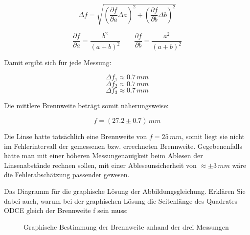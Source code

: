 \documentclass[
  headings=optiontotocandhead,
  twoside,
  openright,
  numbers=noenddot,
  toc=flat,
  11pt,
  parskip=full,
  listof=flat,
  bibliography=totoc,
  a4paper,
  DIV=14,
  BCOR=22mm,
  headheight=5mm,
  headinclude=true,
]{scrartcl}
\begin{document}
$$
\Delta f =
\sqrt{
\left(\frac{\partial f}{\partial a}\Delta a\right)^2+
\left(\frac{\partial f}{\partial b}\Delta b\right)^2
}
$$

$$
\frac{\partial f}{\partial a}
= \frac{b^2}{(a+b)^2}
\qquad
\frac{\partial f}{\partial b}
= \frac{a^2}{(a+b)^2}
$$

Damit ergibt sich für jede Messung:

$$\Delta f_1 \approx 0.7\,mm$$
$$\Delta f_2 \approx 0.7\,mm$$
$$\Delta f_3 \approx 0.7\,mm$$

Die mittlere Brennweite beträgt somit näherungsweise:

$$
f = (27.2 \pm 0.7)\,mm
$$

Die Linse hatte tatsächlich eine Brennweite von $f = 25 \, mm$, somit liegt sie nicht im Fehlerintervall der gemessenen bzw. errechneten Brennweite. Gegebenenfalls hätte man mit einer höheren Messungenauigkeit beim Ablesen der Linsenabstände rechnen sollen, mit einer Ableseunsicherheit von $\approx \pm 3\,mm$ wäre die Fehlerabschätzung passender gewesen. 

Das Diagramm für die graphische Lösung der Abbildungsgleichung. Erklären Sie dabei auch, warum bei der graphischen Lösung die Seitenlänge des Quadrates ODCE gleich der Brennweite f sein muss:

\begin{figure}[H]
\centering
{}
\caption{Graphische Bestimmung der Brennweite anhand der drei Messungen}
\label{fig:brennweite_graphisch}
\end{figure}
\end{document}

